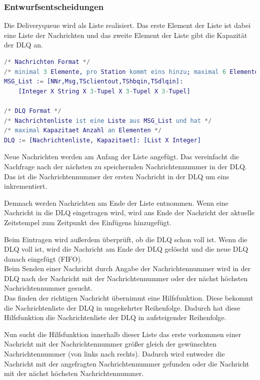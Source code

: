 \documentclass{article}
\begin{document}
\subsubsection{Entwurfsentscheidungen}
Die Deliveryqueue wird als Liste realisiert. Das erste Element der Liste ist dabei eine Liste der Nachrichten und das
zweite Element der Liste gibt die Kapazität der DLQ an.
\begin{lstlisting}[language=erlang]
/* Nachrichten Format */
/* minimal 3 Elemente, pro Station kommt eins hinzu; maximal 6 Elemente */
MSG_List := [NNr,Msg,TSclientout,TShbqin,TSdlqin]:
    [Integer X String X 3-Tupel X 3-Tupel X 3-Tupel]

/* DLQ Format */
/* Nachrichtenliste ist eine Liste aus MSG_List und hat */
/* maximal Kapazitaet Anzahl an Elementen */
DLQ := [Nachrichtenliste, Kapazitaet]: [List X Integer]
\end{lstlisting}

Neue Nachrichten werden am Anfang der Liste angefügt. Das vereinfacht die Nachfrage nach der nächsten zu speichernden
Nachrichtennummer in der DLQ. Das ist die Nachrichtennummer der ersten Nachricht in der DLQ um eins inkrementiert.

Demnach werden Nachrichten am Ende der Liste entnommen. Wenn eine Nachricht in die DLQ eingetragen wird, wird ans Ende
der Nachricht der aktuelle Zeitstempel zum Zeitpunkt des Einfügens hinzugefügt.

Beim Eintragen wird außerdem überprüft, ob die DLQ schon voll ist. Wenn die DLQ voll ist, wird die Nachricht am Ende der
DLQ gelöscht und die neue DLQ danach eingefügt (FIFO).\\

Beim Senden einer Nachricht durch Angabe der Nachrichtennummer wird in der DLQ nach der Nachricht mit der
Nachrichtennummer oder der nächst höchsten Nachrichtennummer gesucht.\\

Das finden der richtigen Nachricht übernimmt eine Hilfsfunktion. Diese bekommt die Nachrichtenliste der DLQ in
umgekehrter Reihenfolge. Dadurch hat diese Hilfsfunktion die Nachrichtenliste der DLQ in aufsteigender Reihenfolge.

Nun sucht die Hilfsfunktion innerhalb dieser Liste das erste vorkommen einer Nachricht mit der Nachrichtennummer größer
gleich der gewünschten Nachrichtennummer (von links nach rechts). Dadurch wird entweder die Nachricht mit der angefragten Nachrichtennummer
gefunden oder die Nachricht mit der nächst höchsten Nachrichtennummer.
\end{document}
